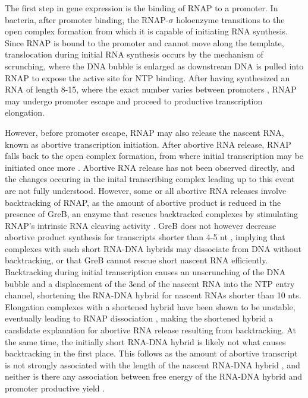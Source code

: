 %
The first step in gene expression is the binding of RNAP to a promoter. In
bacteria, after promoter binding, the RNAP-$\sigma$ holoenzyme transitions to
the open complex formation from which it is capable of initiating RNA
synthesis. Since RNAP is bound to the promoter and cannot move along the
template, translocation during initial RNA synthesis occurs by the mechanism
of scrunching, where the DNA bubble is enlarged as downstream DNA is pulled
into RNAP to expose the active site for NTP binding. After having synthesized
an RNA of length 8-15, where the exact number varies between promoters
\cite{carpousis_cycling_1980,hsu_vitro_2003,tang_real-time_2009,hsu_initial_2006},
RNAP may undergo promoter escape and proceed to productive transcription
elongation.

However, before promoter escape, RNAP may also release the nascent RNA, known
as abortive transcription initiation. After abortive RNA release, RNAP falls
back to the open complex formation, from where initial transcription may be
initiated once more \cite{carpousis_cycling_1980}. Abortive RNA release has
not been observed directly, and the changes occuring in the inital
transcribing complex leading up to this event are not fully understood.
However, some or all abortive RNA releases involve backtracking of RNAP, as
the amount of abortive product is reduced in the presence of GreB, an enzyme
that rescues backtracked complexes by stimulating RNAP's intrinsic RNA
cleaving
activity \cite{hsu_escherichia_1995,feng_grea-induced_1994,hsu_initial_2006}.
GreB does not however decrease abortive product synthesis for transcripts
shorter than 4-5 nt \cite{hsu_initial_2006}, implying that complexes with such
short RNA-DNA hybrids may dissociate from DNA without backtracking, or that
GreB cannot rescue short nascent RNA efficiently. Backtracking during initial
transcription causes an unscrunching of the DNA bubble and a displacement of
the 3\ppp end of the nascent RNA into the NTP entry channel, shortening the
RNA-DNA hybrid for nascent RNAs shorter than 10 nts. Elongation complexes with
a shortened hybrid have been shown to be unstable, eventually leading to RNAP
dissociation \cite{nudler_rnadna_1997}, making the shortened hybrid a
candidate explanation for abortive RNA release resulting from backtracking. At
the same time, the initially short RNA-DNA hybrid is likely not what causes
backtracking in the first place. This follows as the amount of abortive
transcript is not strongly associated with the length of the nascent RNA-DNA
hybrid \cite{hsu_initial_2006}, and neither is there any association between
free energy of the RNA-DNA hybrid and promoter productive yield
\cite{skancke_sequence-dependent_2015}.

